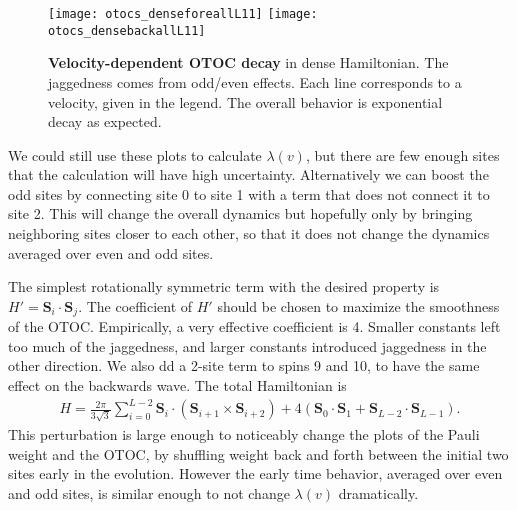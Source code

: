 \begin{figure}
	\centering
	\texttt{[image: otocs\_denseforeallL11]}
	\texttt{[image: otocs\_densebackallL11]}
	\caption{\textbf{Velocity-dependent OTOC decay} in dense Hamiltonian. The jaggedness comes from odd/even effects. Each line corresponds to a velocity, given in the legend. The overall behavior is exponential decay as expected.}
	\label{fig:otocs_denseforeallL11}
\end{figure}

We could still use these plots to calculate $\lambda(v)$, but there are few enough sites that the calculation will have high uncertainty. Alternatively we can boost the odd sites by connecting site 0 to site 1 with a term that does not connect it to site 2. This will change the overall dynamics but hopefully only by bringing neighboring sites closer to each other, so that it does not change the dynamics averaged over even and odd sites.

The simplest rotationally symmetric term with the desired property is $H'=\bm{S}_i\cdot\bm{S}_j$. The coefficient of $H'$ should be chosen to maximize the smoothness of the OTOC. Empirically, a very effective coefficient is 4. Smaller constants left too much of the jaggedness, and larger constants introduced jaggedness in the other direction. We also dd a 2-site term to spins 9 and 10, to have the same effect on the backwards wave. The total Hamiltonian is
\begin{align}
H = \frac{2\pi}{3\sqrt{3}}\sum_{i=0}^{L-2}\bm{S}_i \cdot \left(\bm{S}_{i+1}
	\times\bm{S}_{i+2}\right) + 4\left(\bm{S}_0\cdot\bm{S}_1 + \bm{S}_{L-2}
	\cdot\bm{S}_{L-1}\right).
\end{align}
This perturbation is large enough to noticeably change the plots of the Pauli weight and the OTOC, by shuffling weight back and forth between the initial two sites early in the evolution. However the early time behavior, averaged over even and odd sites, is similar enough to not change $\lambda(v)$ dramatically.

